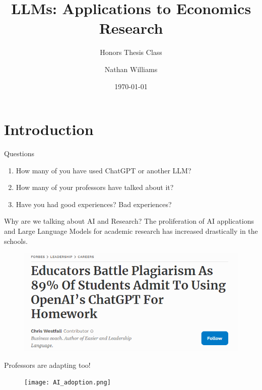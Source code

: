 \documentclass[
	11pt, %
	aspectratio=169, %
]{beamer}
\title{LLMs: Applications to Economics Research}
\subtitle{Honors Thesis Class}
\date{\today}
\author{Nathan Williams}
\begin{document}
\begin{frame}
\maketitle
\end{frame}
\section{Introduction}
\begin{frame}{Questions}
    \begin{enumerate}
        \setlength{\itemsep}{20pt}
        \item How many of you have used ChatGPT or another LLM?
        \item How many of your professors have talked about it?
        \item Have you had good experiences? Bad experiences?
    \end{enumerate}
\end{frame}
\begin{frame}{Why are we talking about AI and Research?}
    The proliferation of AI applications and Large Language Models for academic research has increased drastically in the schools.
    \begin{figure}
        \centering
        \includegraphics{News Screeenshot 1.png}
        \label{News Article}
    \end{figure}
\end{frame}
\begin{frame}{Professors are adapting too!}
    \begin{figure}
        \centering
        \texttt{[image: AI\_adoption.png]}
        \label{Tweet}
    \end{figure}
\end{frame}
\end{document}
